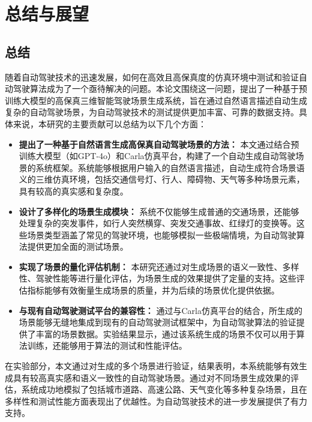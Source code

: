 \chapter{总结与展望}

\section{总结}

随着自动驾驶技术的迅速发展，如何在高效且高保真度的仿真环境中测试和验证自动驾驶算法成为了一个亟待解决的问题。本论文围绕这一问题，提出了一种基于预训练大模型的高保真三维智能驾驶场景生成系统，旨在通过自然语言描述自动生成复杂的自动驾驶场景，为自动驾驶技术的测试提供更加丰富、可靠的数据支持。具体来说，本研究的主要贡献可以总结为以下几个方面：

\begin{itemize}
	\item \textbf{提出了一种基于自然语言生成高保真自动驾驶场景的方法：} 本文通过结合预训练大模型（如GPT-4o）和Carla仿真平台，构建了一个自动生成自动驾驶场景的系统框架。系统能够根据用户输入的自然语言描述，自动生成符合场景语义的三维仿真环境，包括交通信号灯、行人、障碍物、天气等多种场景元素，具有较高的真实感和复杂度。
	
	\item \textbf{设计了多样化的场景生成模块：} 系统不仅能够生成普通的交通场景，还能够处理复杂的突发事件，如行人突然横穿、突发交通事故、红绿灯的变换等。这些场景类型涵盖了常见的驾驶环境，也能够模拟一些极端情境，为自动驾驶算法提供更加全面的测试场景。
	
	\item \textbf{实现了场景的量化评估机制：} 本研究还通过对生成场景的语义一致性、多样性、驾驶性能等进行量化评估，为场景生成的效果提供了定量的支持。这些评估指标能够有效衡量生成场景的质量，并为后续的场景优化提供依据。
	
	\item \textbf{与现有自动驾驶测试平台的兼容性：} 通过与Carla仿真平台的结合，所生成的场景能够无缝地集成到现有的自动驾驶测试框架中，为自动驾驶算法的验证提供了丰富的场景数据。实验结果显示，通过该系统生成的场景不仅可以用于算法训练，还能够用于算法的测试和性能评估。
\end{itemize}

在实验部分，本文通过对生成的多个场景进行验证，结果表明，本系统能够有效生成具有较高真实感和语义一致性的自动驾驶场景。通过对不同场景生成效果的评估，系统成功地模拟了包括城市道路、高速公路、天气变化等多种复杂场景，且在多样性和测试性能方面表现出了优越性。为自动驾驶技术的进一步发展提供了有力支持。

